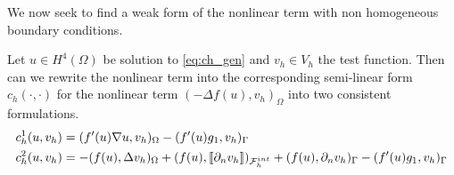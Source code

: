We now seek to find a weak form of the nonlinear term with non homogeneous boundary conditions.
\begin{lemma}
    Let $u \in H^4( \Omega ) $ be solution to \eqref{eq:ch_gen} and $v_{h} \in V_{h}$ the test function.
Then can we rewrite the nonlinear term into the corresponding semi-linear form $c_{h}( \cdot ,\cdot )  $ for the nonlinear term $( -\Delta f( u) , v_{h})_{\Omega }$ into two consistent formulations.
\begin{align}
    \label{eq:ch:1}
      c^{1}_{h} ( u,v_{h})  & = ( f' ( u) \nabla u, v_{h} )_{\Omega }  - ( f'( u)  g_{1}   ,  v_{h})_{\Gamma } \\
    \label{eq:ch:2}
        c^{2}_{h} ( u,v_{h})  & = -( f( u), \Delta v_{h} )_{\Omega }+  ( f( u) , \left[\!\left[  \partial _{n}v_{h}  \right]\!\right]  )_{\mathcal{F} _{h}^{int}} + ( f(u), \partial _{n} v_{h})_{\Gamma  }  - ( f'( u)  g_{1}   ,  v_{h})_{\Gamma }
\end{align}

\end{lemma}

